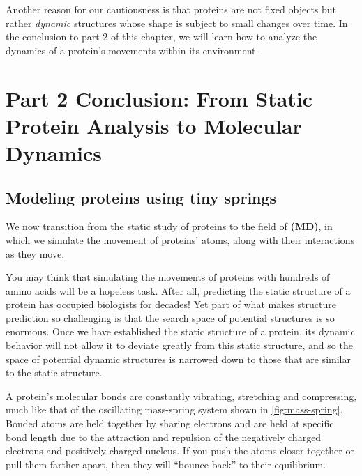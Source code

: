 Another reason for our cautiousness is that proteins are not fixed objects but rather \textit{dynamic} structures whose shape is subject to small changes over time. In the conclusion to part 2 of this chapter, we will learn how to analyze the dynamics of a protein's movements within its environment.

\FloatBarrier
{}

\section{Part 2 Conclusion: From Static Protein Analysis to Molecular Dynamics}
\label{sec:conclusion_part_2}
\subsection{Modeling proteins using tiny springs}

We now transition from the static study of proteins to the field of  \textbf{(MD)}, in which we simulate the movement of proteins' atoms, along with their interactions as they move.

You may think that simulating the movements of proteins with hundreds of amino acids will be a hopeless task. After all, predicting the static structure of a protein has occupied biologists for decades! Yet part of what makes structure prediction so challenging is that the search space of potential structures is so enormous. Once we have established the static structure of a protein, its dynamic behavior will not allow it to deviate greatly from this static structure, and so the space of potential dynamic structures is narrowed down to those that are similar to the static structure.

A protein's molecular bonds are constantly vibrating, stretching and compressing, much like that of the oscillating mass-spring system shown in \autoref{fig:mass-spring}. Bonded atoms are held together by sharing electrons and are held at specific bond length due to the attraction and repulsion of the negatively charged electrons and positively charged nucleus. If you push the atoms closer together or pull them farther apart, then they will ``bounce back'' to their equilibrium.

